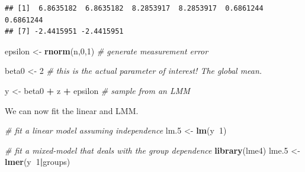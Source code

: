 \documentclass[]{book}
\newenvironment{Shaded}{\begin{snugshade}}{\end{snugshade}}
\newcommand{\CommentTok}[1]{\textcolor[rgb]{0.56,0.35,0.01}{\textit{#1}}}
\newcommand{\DataTypeTok}[1]{\textcolor[rgb]{0.13,0.29,0.53}{#1}}
\newcommand{\DecValTok}[1]{\textcolor[rgb]{0.00,0.00,0.81}{#1}}
\newcommand{\FloatTok}[1]{\textcolor[rgb]{0.00,0.00,0.81}{#1}}
\newcommand{\KeywordTok}[1]{\textcolor[rgb]{0.13,0.29,0.53}{\textbf{#1}}}
\newcommand{\NormalTok}[1]{#1}
\newcommand{\OperatorTok}[1]{\textcolor[rgb]{0.81,0.36,0.00}{\textbf{#1}}}
\newcommand{\StringTok}[1]{\textcolor[rgb]{0.31,0.60,0.02}{#1}}
\theoremstyle{definition}
\theoremstyle{definition}
\theoremstyle{definition}
\theoremstyle{remark}
\begin{document}
\begin{Shaded}
\end{Shaded}

\begin{verbatim}
## [1]  6.8635182  6.8635182  8.2853917  8.2853917  0.6861244  0.6861244
## [7] -2.4415951 -2.4415951
\end{verbatim}

\begin{Shaded}
\begin{Highlighting}[]
\NormalTok{epsilon <-}\StringTok{ }\KeywordTok{rnorm}\NormalTok{(n,}\DecValTok{0}\NormalTok{,}\DecValTok{1}\NormalTok{) }\CommentTok{# generate measurement error}

\NormalTok{beta0 <-}\StringTok{ }\DecValTok{2} \CommentTok{# this is the actual parameter of interest! The global mean.}

\NormalTok{y <-}\StringTok{ }\NormalTok{beta0 }\OperatorTok{+}\StringTok{ }\NormalTok{z }\OperatorTok{+}\StringTok{ }\NormalTok{epsilon }\CommentTok{# sample from an LMM}
\end{Highlighting}
\end{Shaded}

We can now fit the linear and LMM.

\begin{Shaded}
\begin{Highlighting}[]
\CommentTok{# fit a linear model assuming independence}
\NormalTok{lm}\FloatTok{.5}\NormalTok{ <-}\StringTok{ }\KeywordTok{lm}\NormalTok{(y}\OperatorTok{~}\DecValTok{1}\NormalTok{)  }

\CommentTok{# fit a mixed-model that deals with the group dependence}
\KeywordTok{library}\NormalTok{(lme4)}
\NormalTok{lme}\FloatTok{.5}\NormalTok{ <-}\StringTok{ }\KeywordTok{lmer}\NormalTok{(y}\OperatorTok{~}\DecValTok{1}\OperatorTok{|}\NormalTok{groups) }
\end{Highlighting}
\end{Shaded}
\end{document}
